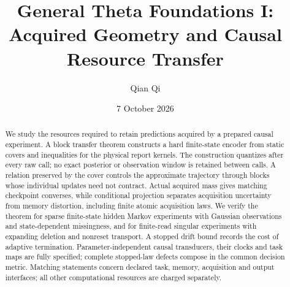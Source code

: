 \documentclass[11pt]{amsart}
\title{General Theta Foundations I:\\Acquired Geometry and Causal Resource Transfer}
\author{Qian Qi}
\date{7 October 2026}
\theoremstyle{definition}
\theoremstyle{remark}
\begin{document}
\begin{abstract}
We study the resources required to retain predictions acquired by a prepared causal experiment. A block transfer theorem constructs a hard finite-state encoder from static covers and inequalities for the physical report kernels. The construction quantizes after every raw call; no exact posterior or observation window is retained between calls. A relation preserved by the cover controls the approximate trajectory through blocks whose individual updates need not contract. Actual acquired mass gives matching checkpoint converses, while conditional projection separates acquisition uncertainty from memory distortion, including finite atomic acquisition laws. We verify the theorem for sparse finite-state hidden Markov experiments with Gaussian observations and state-dependent missingness, and for finite-read singular experiments with expanding deletion and nonreset transport. A stopped drift bound records the cost of adaptive termination. Parameter-independent causal transducers, their clocks and task maps are fully specified; complete stopped-law defects compose in the common decision metric. Matching statements concern declared task, memory, acquisition and output interfaces; all other computational resources are charged separately.
\end{abstract}
\maketitle








\end{document}
